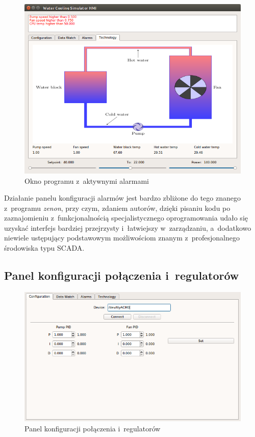 \newpage
\begin{figure}[!ht]
    \centering
    \includegraphics[width=\textwidth]{../img/activealarms.png}
    \caption{Okno programu z~aktywnymi alarmami}
    \label{fig:activealarms}
\end{figure}

Działanie panelu konfiguracji alarmów jest bardzo zbliżone do tego znanego
z~programu \textit{zenon}, przy czym, zdaniem autorów, dzięki pisaniu kodu po
zaznajomieniu z~funkcjonalnością specjalistycznego oprogramowania udało się
uzyskać interfejs bardziej przejrzysty i~łatwiejszy w~zarządzaniu, a~dodatkowo
niewiele ustępujący podstawowym możliwościom znanym z~profesjonalnego środowiska
typu SCADA.

\newpage
\subsection{Panel konfiguracji połączenia i~regulatorów}
\indent

\begin{figure}[!ht]
    \centering
    \includegraphics[width=\textwidth]{../img/config.png}
    \caption{Panel konfiguracji połączenia i~regulatorów}
    \label{fig:config}
\end{figure}

